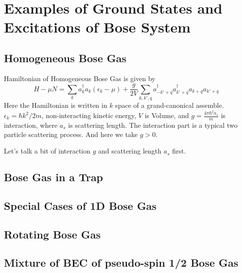 \chapter{Examples of Ground States and Excitations of Bose System }
\section{Homogeneous Bose Gas}
Hamiltonian of Homogeneous Bose Gas is given by
\begin{equation}
H-\mu N = \sum_k a_k^\dag a_k (\epsilon_k -\mu) +\frac{g}{2V} \sum_{k,k',q} a_{-k'+q}^\dag a_{k'+q}^\dag a_{k+q}a_{k'+q}
\end{equation}
Here the Hamiltonian is written in $k$ space of a grand-canonical assemble. $\epsilon_k = \hbar k^2/2m$, non-interacting kinetic energy, $V$ is Volume, and $g=\frac{4\pi\hbar^2 a_s}{m}$ is interaction, where $a_s$ is scattering length. The interaction part is a typical two particle scattering process. And here we take $g > 0$.

Let's talk a bit of interaction $g$ and scattering length $a_s$ first.


{\color{red}{(0120 16:00)}}

\section{Bose Gas in a Trap}
\section{Special Cases of 1D Bose Gas}
\section{Rotating Bose Gas}
\section{Mixture of BEC of pseudo-spin 1/2 Bose Gas}